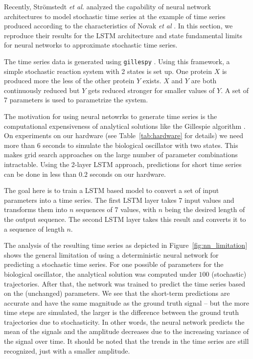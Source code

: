 \documentclass{article}
\begin{document}
Recently, Strömstedt \textit{et al.} analyzed the capability of neural network
architectures to model stochastic time series \cite{stroemstedt2018} at the
example of time series produced according to the characteristics of Novak
\textit{et al} \cite{novak2008}. In this section, we reproduce their results for
the LSTM architecture and state fundamental limits for neural networks to
approximate stochastic time series.

The time series data is generated using \texttt{gillespy} \cite{abel2016}.
Using this framework, a simple stochastic reaction system with 2 states is
set up. One protein $X$ is produced more the less of the other protein $Y$
exists. $X$ and $Y$ are both continuously reduced but $Y$ gets reduced stronger
for smaller values of $Y$. A set of 7 parameters is used to parametrize the
system.

The motivation for using neural netowrks to generate time series is the
computational expensiveness of analytical solutions like the Gillespie
algorithm \cite{gillespie1977}. On experiments on our hardware
(see Table~\ref{tab:hardware} for details)
we need more than 6 seconds to simulate the biological oscillator with two
states. This makes grid search approaches on the large number of parameter
combinations intractable. Using the 2-layer LSTM approach, predictions for
short time series can be done in less than $0.2$ seconds on our hardware.

The goal here is to train a LSTM based
model to convert a set of input parameters into a time series. The first
LSTM layer
takes 7 input values and transforms them into $n$ sequences of 7 values, with
$n$ being the desired length of the output sequence. The second LSTM layer
takes this result and converts it to a sequence of length $n$.

The analysis of the resulting time series as depicted in
Figure~\ref{fig:nn_limitation} shows the general limitation of using a
deterministic neural network for predicting a stochastic time series. For one
possible of parameters for the biological oscillator, the analytical solution
was computed under $100$ (stochastic) trajectories. After that, the network was
trained to predict the time series based on the (unchanged) parameters. We see
that the short-term predictions are accurate and have the same magnitude as the
ground truth signal -- but the more time steps are simulated, the larger is the
difference between the ground truth trajectories due to stochasticity. In other
words, the neural network predicts the mean of the signals and the amplitude
decreases due to the increasing variance of the signal over time.
It should be noted that the trends in the time series are still
recognized, just with a smaller amplitude.
\end{document}
